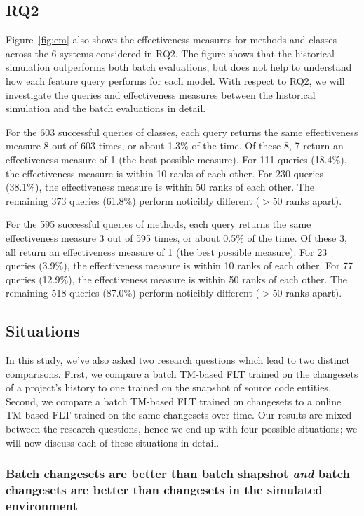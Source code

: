\subsection{RQ2}

Figure~\ref{fig:em} also shows the effectiveness measures for methods and
classes across the 6 systems considered in RQ2. The figure shows that the
historical simulation outperforms both batch evaluations, but does not help to
understand how each feature query performs for each model.  With respect to RQ2,
we will investigate the queries and effectiveness measures between the
historical simulation and the batch evaluations in detail.

For the 603 successful queries of classes, each query returns the same
effectiveness measure 8 out of 603 times, or about 1.3\% of the time.  Of these
8, 7 return an effectiveness measure of 1 (the best possible measure).  For 111
queries (18.4\%), the effectiveness measure is within 10 ranks of each other.
For 230 queries (38.1\%), the effectiveness measure is within 50 ranks of each
other.  The remaining 373 queries (61.8\%) perform noticibly different ($> 50$
ranks apart).

For the 595 successful queries of methods, each query returns the same
effectiveness measure 3 out of 595 times, or about 0.5\% of the time.  Of these
3, all return an effectiveness measure of 1 (the best possible measure).  For 23
queries (3.9\%), the effectiveness measure is within 10 ranks of each other.
For 77 queries (12.9\%), the effectiveness measure is within 50 ranks of each
other.  The remaining 518 queries (87.0\%) perform noticibly different ($> 50$
ranks apart).

\subsection{Situations}


In this study, we've also asked two research questions which lead to two
distinct comparisons.  First, we compare a batch TM-based FLT trained on the
changesets of a project's history to one trained on the snapshot of source code
entities.  Second, we compare a batch TM-based FLT trained on changesets to a
online TM-based FLT trained on the same changesets over time.  Our results are
mixed between the research questions, hence we end up with four possible
situations; we will now discuss each of these situations in detail.

\subsubsection{Batch changesets are better than batch shapshot
\emph{and} batch changesets are better than changesets in the simulated environment}


